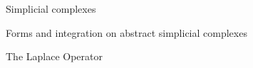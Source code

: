 \documentclass[../main.tex]{subfiles}
\begin{document}
    \begin{section}{Simplicial complexes} 
            
    \end{section}
    \begin{section}{Forms and integration on abstract simplicial complexes}
            
    \end{section}
    \begin{section}{The Laplace Operator}
    \end{section}
\end{document}

